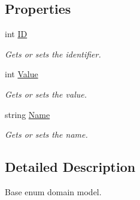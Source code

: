 \subsection*{Properties}
\begin{DoxyCompactItemize}
\item 
int \mbox{\hyperlink{class_bar_none_1_1_shared_1_1_domain_model_1_1_core_1_1_base_enum_domain_model_a0884a9791405695e2def5f2188004128}{ID}}
\begin{DoxyCompactList}\small\item\em Gets or sets the identifier. \end{DoxyCompactList}\item 
int \mbox{\hyperlink{class_bar_none_1_1_shared_1_1_domain_model_1_1_core_1_1_base_enum_domain_model_a399b31c8ce55c45dc9372a3292e9d1c5}{Value}}
\begin{DoxyCompactList}\small\item\em Gets or sets the value. \end{DoxyCompactList}\item 
string \mbox{\hyperlink{class_bar_none_1_1_shared_1_1_domain_model_1_1_core_1_1_base_enum_domain_model_ac2c43714825cc73ae53f2a784438cc6c}{Name}}
\begin{DoxyCompactList}\small\item\em Gets or sets the name. \end{DoxyCompactList}\end{DoxyCompactItemize}


\subsection{Detailed Description}
Base enum domain model. 


